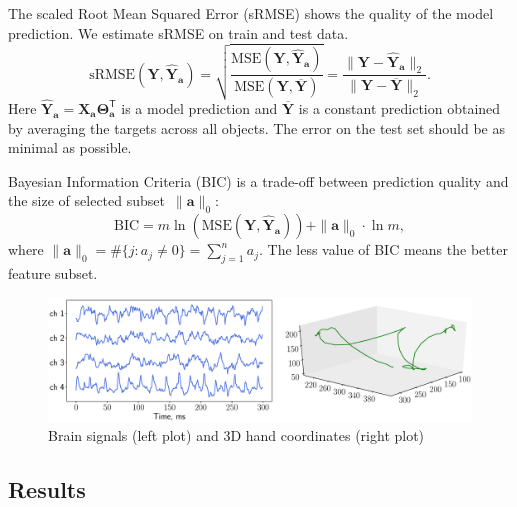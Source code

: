 \documentclass[12pt,oneside]{article}
\theoremstyle{definition}
\newcommand{\ba}{\mathbf{a}}
\newcommand{\bY}{\mathbf{Y}}
\newcommand{\bX}{\mathbf{X}}
\newcommand{\T}{\mathsf{T}}
\newcommand{\bTheta}{\boldsymbol{\Theta}}
\begin{document}
The scaled Root Mean Squared Error (sRMSE) shows the quality of the model prediction. We estimate sRMSE on train and test data.
\begin{equation}
\text{sRMSE}(\bY, \widehat{\bY}_{\ba}) = \sqrt{\frac{\text{MSE} (\bY, \widehat{\bY}_{\ba})}{\text{MSE} (\bY, \overline{\bY})}} =  \frac{\| \bY - \widehat{\bY}_{\ba} \|_2}{\| \bY - \overline{\bY} \|_2}.
\end{equation}
Here $\widehat{\bY}_{\ba} = \bX_{\ba} \bTheta_{\ba}^{\T}$ is a model prediction and $\overline{\bY}$ is a constant prediction obtained by averaging the targets across all objects.
The error on the test set should be as minimal as possible.

Bayesian Information Criteria (BIC) is a trade-off between prediction quality and the size of selected subset~$\|\ba\|_0$:
\begin{equation}
\text{BIC} = m \ln \left( \text{MSE} ( \bY, \widehat{\bY}_{\ba})\right) + \| \ba \|_0 \cdot \ln m,
\end{equation}
where $\|\ba\|_0 = \#\{j: a_j \neq 0\}= \sum_{j=1}^n a_j$.
The less value of BIC means the better feature subset.

\begin{figure}
	\centering
	\includegraphics[width=\linewidth]{figs/ecog_data}
	\caption{Brain signals (left plot) and 3D hand coordinates (right plot)}
	\label{fig:ecog_data}
\end{figure}

\subsection{Results}
\end{document}
